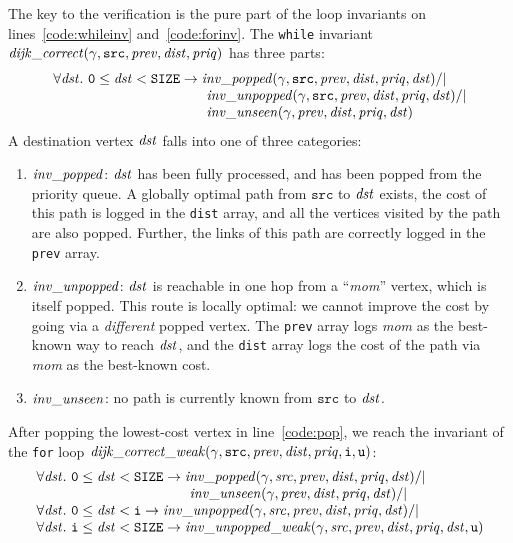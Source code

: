The key to the verification is the pure part of the loop 
invariants on lines~\ref{code:whileinv} and~\ref{code:forinv}.  The \texttt{while} invariant $\mathit{dijk\_correct}(\gamma, \texttt{src}, \mathit{prev}, \mathit{dist}, \mathit{priq})$ has three parts:
\[
\begin{array}{l}
\forall \m{dst}.~\texttt{0} \le \m{dst} < \texttt{SIZE} -> \m{inv\_popped}(\gamma, \texttt{src}, \m{prev}, \m{dist}, \m{priq}, \m{dst}) /| \null \\
\hspace{11em}\m{inv\_unpopped}(\gamma, \texttt{src}, \m{prev}, \m{dist}, \m{priq}, \m{dst}) /| \null \\
\hspace{11em}\m{inv\_unseen}(\gamma, \m{prev}, \m{dist}, \m{priq}, \m{dst})
\end{array}
\]
A destination vertex $\mathit{dst}$ falls into one of three
categories:
\begin{enumerate}
\item $\mathit{inv\_popped}$: $\mathit{dst}$ has been fully processed, and has been
popped from the priority queue.
A globally optimal path from $\texttt{src}$
to $\mathit{dst}$ exists, the cost of this path is logged in
the \texttt{dist} array, and all the vertices visited by the path are also popped.
Further, the links of this path are correctly logged in the \texttt{prev} array.
\item $\mathit{inv\_unpopped}$: $\mathit{dst}$ is reachable in
one hop from a ``\emph{mom}'' vertex, which is itself popped.
This route is locally optimal: we cannot
improve the cost by going via a \emph{different} popped vertex.
The \texttt{prev} array logs
\emph{mom} as the best-known way to reach $\mathit{dst}$, and the \texttt{dist}
array logs the cost of the path via \emph{mom} as the best-known cost.
\item $\mathit{inv\_unseen}$: no path is currently known from $\texttt{src}$ to $\mathit{dst}$.
\end{enumerate}
After popping the lowest-cost vertex in line~\ref{code:pop}, we reach the invariant of
the \texttt{for} loop $\mathit{dijk\_correct\_weak}(\gamma, \texttt{src}, \mathit{prev}, \mathit{dist}, \mathit{priq}, \texttt{i}, \texttt{u})$:
\[
\begin{array}{l}
\forall \m{dst}.~\texttt{0} \le \m{dst} < \texttt{SIZE} -> \m{inv\_popped}(\gamma, \m{src}, \m{prev}, \m{dist}, \m{priq}, \m{dst}) /| \null \\
\hspace{11em}\m{inv\_unseen}(\gamma, \m{prev}, \m{dist}, \m{priq}, \m{dst}) /| \null \\
\forall \m{dst}.~\texttt{0} \le \m{dst} < \texttt{i} -> \m{inv\_unpopped}(\gamma, \m{src}, \m{prev}, \m{dist}, \m{priq}, \m{dst}) /| \null \\
\forall \m{dst}.~\texttt{i} \le \m{dst} < \texttt{SIZE} -> \m{inv\_unpopped\_weak}(\gamma, \m{src}, \m{prev}, \m{dist}, \m{priq}, \m{dst}, \texttt{u})
\end{array}
\]
